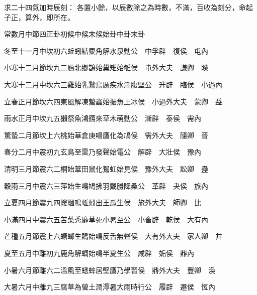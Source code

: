 \begin{pinyinscope}
求二十四氣加時辰刻：
 各置小餘，以辰數除之為時數，不滿，百收為刻分，命起子正，算外，即所在。



 常數月中節四正卦初候中候末候始卦中卦末卦



 冬至十一月中坎初六蚯蚓結麋角解水泉動公　中孚辟　復侯　屯內



 小寒十二月節坎九二鴈北鄉鵲始巢雉始雊侯　屯外大夫　謙卿　睽



 大寒十二月中坎六三雞始乳鷙鳥厲疾水澤腹堅公　升辟　臨侯　小過內



 立春正月節坎六四東風解凍蟄蟲始振魚上冰侯　小過外大夫　蒙卿　益



 雨水正月中坎九五獺祭魚鴻鴈來草木萌動公　漸辟　泰侯　需內



 驚蟄二月節坎上六桃始華倉庚鳴鷹化為鳩侯　需外大夫　隨卿　晉



 春分二月中震初九玄鳥至雷乃發聲始電公　解辟　大壯侯　豫內



 清明三月節震六二桐始華田鼠化鴽虹始見侯　豫外大夫　訟卿　蠱



 穀雨三月中震六三萍始生鳴鳩拂羽戴勝降桑公　革辟　夬侯　旅內



 立夏四月節震九四螻蟈鳴蚯蚓出王瓜生侯　旅外大夫　師卿　比



 小滿四月中震六五苦菜秀靡草死小暑至公　小畜辟　乾侯　大有內



 芒種五月節震上六螗螂生鵙始鳴反舌無聲侯　大有外大夫　家人卿　井



 夏至五月中離初九鹿角解蜩始鳴半夏生公　咸辟　姤侯　鼎內



 小暑六月節離六二溫風至蟋蟀居壁鷹乃學習侯　鼎外大夫　豐卿　渙



 大暑六月中離九三腐草為螢土潤溽暑大雨時行公　履辟　遯侯　恆內




\end{pinyinscope}
